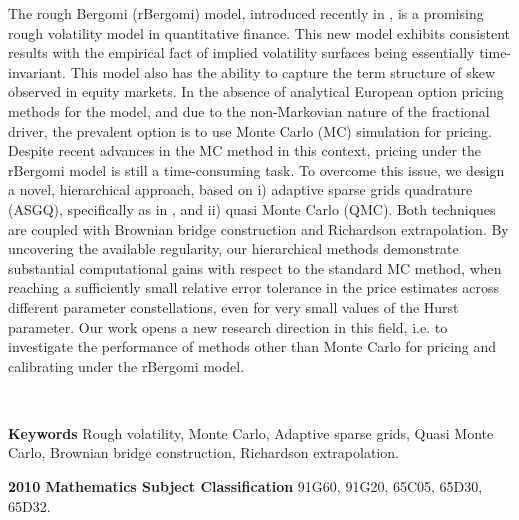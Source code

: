 The rough Bergomi (rBergomi) model, introduced recently in  \cite{bayer2016pricing}, is a promising rough volatility model in quantitative finance. This new model exhibits consistent results with the empirical fact of implied volatility surfaces being essentially time-invariant. This model also has  the  ability to capture the term structure of skew observed in equity markets. In the absence of analytical European option pricing methods for the model, and due to the non-Markovian nature of the fractional driver, the prevalent option is to use Monte Carlo (MC) simulation for pricing. Despite recent advances in the MC method in this context, pricing under the rBergomi model is still a time-consuming task. To overcome this issue, we design a novel, hierarchical approach, based on i) adaptive sparse grids quadrature (ASGQ), specifically as in \cite{haji2016multi}, and ii) quasi Monte Carlo (QMC). Both techniques are coupled with Brownian bridge construction and Richardson extrapolation. By uncovering the available regularity,  our hierarchical methods demonstrate substantial computational gains with respect to the standard MC method, when reaching a sufficiently small relative error tolerance in the price estimates across different parameter constellations, even for very small values of the Hurst  parameter. Our work opens a new research direction in this field, i.e. to investigate the performance of  methods  other than Monte Carlo for pricing and calibrating under the rBergomi model.

\

\textbf{Keywords} Rough volatility, Monte Carlo, Adaptive sparse grids, Quasi Monte Carlo, Brownian bridge construction, Richardson extrapolation.

\textbf{2010 Mathematics Subject Classification} 	91G60, 	91G20, 65C05, 65D30, 65D32.